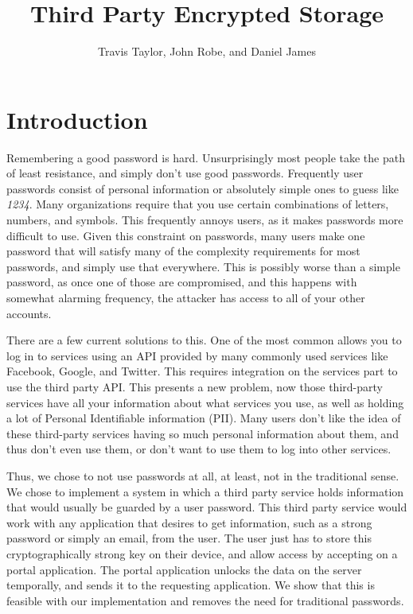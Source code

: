 \documentclass[letterpaper,twocolumn,10pt]{article}
\title{Third Party Encrypted Storage}
\author{Travis Taylor, John Robe, and Daniel James}
\affil{School of Computing, University of Utah}
\begin{document}
\lstset{style=codestyle}


\maketitle

\section{Introduction}

Remembering a good password is hard. Unsurprisingly most people take the path of least resistance, and simply don't use good passwords. Frequently user passwords consist of personal information or absolutely simple ones to guess like \textit{1234}\cite{easypass}. Many organizations require that you use certain combinations of letters, numbers, and symbols. This frequently annoys users, as it makes passwords more difficult to use. Given this constraint on passwords, many users make one password that will satisfy many of the complexity requirements for most passwords, and simply use that everywhere. This is possibly worse than a simple password, as once one of those are compromised, and this happens with somewhat alarming frequency\cite{databreach}, the attacker has access to all of your other accounts.

There are a few current solutions to this. One of the most common allows you to log in to services using an API provided by many commonly used services like Facebook, Google, and Twitter. This requires integration on the services part to use the third party API. This presents a new problem, now those third-party services have all your information about what services you use, as well as holding a lot of Personal Identifiable information (PII). Many users don't like the idea of these third-party services having so much personal information about them, and thus don't even use them, or don't want to use them to log into other services.

Thus, we chose to not use passwords at all, at least, not in the traditional sense. We chose to implement a system in which a third party service holds information that would usually be guarded by a user password. This third party service would work with any application that desires to get information, such as a strong password or simply an email, from the user. The user just has to store this cryptographically strong key on their device, and allow access by accepting on a portal application. The portal application unlocks the data on the server temporally, and sends it to the requesting application.  We show that this is feasible with our implementation and removes the need for traditional passwords. 
\end{document}
